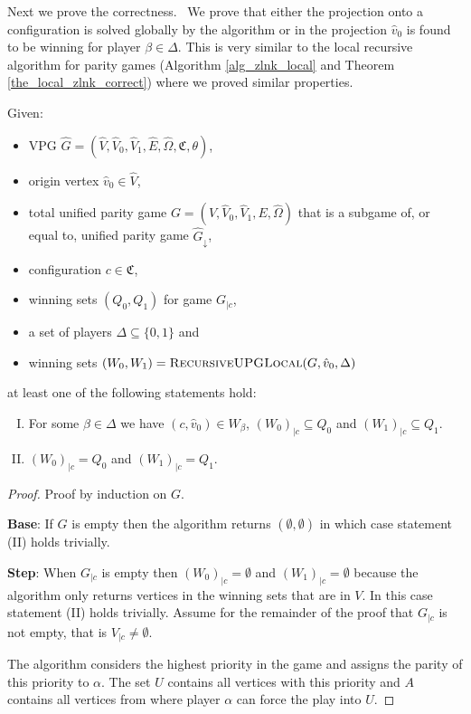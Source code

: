 Next we prove the correctness. \ We prove that either the projection onto a configuration is solved globally by the algorithm or in the projection $\hat{v}_0$ is found to be winning for player $\beta \in \Delta$. This is very similar to the local recursive algorithm for parity games (Algorithm \ref{alg_zlnk_local} and Theorem \ref{the_local_zlnk_correct}) where we proved similar properties.
\begin{theorem}
	Given:
	\begin{itemize}
		\item VPG $\hat{G} = (\hat{V}, \hat{V}_0,\hat{V}_1,\hat{E},\hat{\Omega},\mathfrak{C},\theta)$,
		\item origin vertex $\hat{v}_0 \in \hat{V}$,
		\item total unified parity game $G = (V, \hat{V}_0, \hat{V}_1,E,\hat{\Omega})$ that is a subgame of, or equal to, unified parity game $\hat{G}_{\downarrow}$,
		\item configuration $c\in \mathfrak{C}$,
		\item winning sets $(Q_0,Q_1)$ for game $G_{|c}$,
		\item a set of players $\Delta \subseteq \{0,1\}$ and
		\item winning sets $(W_0, W_1) = \textsc{RecursiveUPGLocal}(G,\hat{v}_0,\Delta)$
	\end{itemize}
	at least one of the following statements hold:
	\begin{enumerate}[(I)]
		\item For some $\beta \in \Delta$ we have $(c,\hat{v}_0) \in W_\beta$, $(W_0)_{|c} \subseteq Q_0$ and $(W_1)_{|c} \subseteq Q_1$.
		\item $(W_0)_{|c} = Q_0$ and $(W_1)_{|c} = Q_1$.
	\end{enumerate}
	\begin{proof}
		Proof by induction on $G$.
		
		\textbf{Base}: If $G$ is empty then the algorithm returns $(\emptyset,\emptyset)$ in which case statement (II) holds trivially.
		
		\textbf{Step}:
		When $G_{|c}$ is empty then $(W_0)_{|c} = \emptyset$ and $(W_1)_{|c} = \emptyset$ because the algorithm only returns vertices in the winning sets that are in $V$. In this case statement (II) holds trivially. Assume for the remainder of the proof that $G_{|c}$ is not empty, that is $V_{|c} \neq \emptyset$.
		
		The algorithm considers the highest priority in the game and assigns the parity of this priority to $\alpha$. The set $U$ contains all vertices with this priority and $A$ contains all vertices from where player $\alpha$ can force the play into $U$.
		

\end{proof}
\end{theorem}
